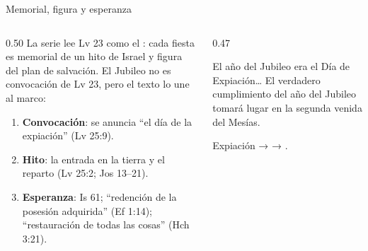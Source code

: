 \begin{frame}{Memorial, figura y esperanza}
\begin{columns}[c,onlytextwidth]
\begin{column}{0.50\textwidth}\scriptsize\RaggedRight
La serie lee Lv 23 como el : cada fiesta es memorial de un hito de Israel y figura del plan de salvación. El Jubileo no es convocación de Lv 23, pero el texto lo une al marco:
\begin{enumerate}
\item \textbf{Convocación}: se anuncia ``el día de la expiación'' (Lv 25:9).
\item \textbf{Hito}: la entrada en la tierra y el reparto (Lv 25:2; Jos 13--21).
\item \textbf{Esperanza}: Is 61; ``redención de la posesión adquirida'' (Ef 1:14); ``restauración de todas las cosas'' (Hch 3:21).
\end{enumerate}
\end{column}
\begin{column}{0.47\textwidth}
\begin{cita}El año del Jubileo era el Día de Expiación\ldots{} El verdadero cumplimiento del año del Jubileo tomará lugar en la segunda venida del Mesías.\end{cita}
\scriptsize Expiación →  → .
\end{column}
\end{columns}
\end{frame}

